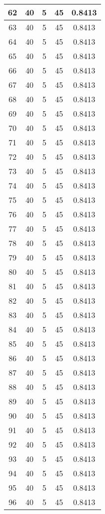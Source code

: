 \documentclass[letterpaper, 12pt]{article}
\begin{document}
\begin{longtable}{|c|c|c|c|c|}
\hline
62 & 40 & 5 & 45 & 0.8413 \\
\hline
63 & 40 & 5 & 45 & 0.8413 \\
\hline
64 & 40 & 5 & 45 & 0.8413 \\
\hline
65 & 40 & 5 & 45 & 0.8413 \\
\hline
66 & 40 & 5 & 45 & 0.8413 \\
\hline
67 & 40 & 5 & 45 & 0.8413 \\
\hline
68 & 40 & 5 & 45 & 0.8413 \\
\hline
69 & 40 & 5 & 45 & 0.8413 \\
\hline
70 & 40 & 5 & 45 & 0.8413 \\
\hline
71 & 40 & 5 & 45 & 0.8413 \\
\hline
72 & 40 & 5 & 45 & 0.8413 \\
\hline
73 & 40 & 5 & 45 & 0.8413 \\
\hline
74 & 40 & 5 & 45 & 0.8413 \\
\hline
75 & 40 & 5 & 45 & 0.8413 \\
\hline
76 & 40 & 5 & 45 & 0.8413 \\
\hline
77 & 40 & 5 & 45 & 0.8413 \\
\hline
78 & 40 & 5 & 45 & 0.8413 \\
\hline
79 & 40 & 5 & 45 & 0.8413 \\
\hline
80 & 40 & 5 & 45 & 0.8413 \\
\hline
81 & 40 & 5 & 45 & 0.8413 \\
\hline
82 & 40 & 5 & 45 & 0.8413 \\
\hline
83 & 40 & 5 & 45 & 0.8413 \\
\hline
84 & 40 & 5 & 45 & 0.8413 \\
\hline
85 & 40 & 5 & 45 & 0.8413 \\
\hline
86 & 40 & 5 & 45 & 0.8413 \\
\hline
87 & 40 & 5 & 45 & 0.8413 \\
\hline
88 & 40 & 5 & 45 & 0.8413 \\
\hline
89 & 40 & 5 & 45 & 0.8413 \\
\hline
90 & 40 & 5 & 45 & 0.8413 \\
\hline
91 & 40 & 5 & 45 & 0.8413 \\
\hline
92 & 40 & 5 & 45 & 0.8413 \\
\hline
93 & 40 & 5 & 45 & 0.8413 \\
\hline
94 & 40 & 5 & 45 & 0.8413 \\
\hline
95 & 40 & 5 & 45 & 0.8413 \\
\hline
96 & 40 & 5 & 45 & 0.8413 \\

\end{longtable}
\end{document}

